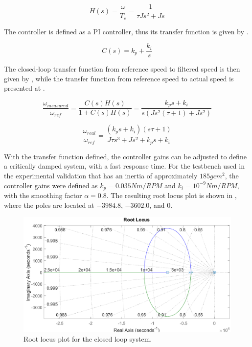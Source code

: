 \begin{equation}
		H(s) = \frac{\omega}{T_e} = \frac{1}{\tau J s^2+J s}
	\label{eq:plant_speed_controller}
\end{equation}

The controller is defined as a PI controller, thus its transfer function is given by .

\begin{equation}
		C(s) = k_p + \frac{k_i}{s}
	\label{eq:controller_speed}
\end{equation}

The closed-loop transfer function from reference speed to filtered speed is then given by , while the transfer function from reference speed to actual speed is presented at .

\begin{equation}
		\frac{\omega_{measured}}{\omega_{ref}} = \frac{C(s) H(s)}{1+C(s) H(s)} = 
		\frac{k_p s + k_i}{s (J s^2 (\tau + 1) + J s^2)}
	\label{eq:closed_loop_speed}
\end{equation}

\begin{equation}
		\frac{\omega_{real}}{\omega_{ref}} = \frac{(k_p s + k_i)(s\tau + 1)}{J\tau s^3 + J s^2 + k_p s + k_i}
		\label{eq:closed_loop_speed_actual}
\end{equation}

With the transfer function defined, the controller gains can be adjusted to define a critically damped system, with a fast response time. For the testbench used in the experimental validation that has an inertia of approximately $185 g cm^2$, the controller gains were defined as $k_p = 0.035Nm/RPM$ and $k_i = 10^{-9} Nm/RPM$, with the smoothing factor $\alpha = 0.8$. The resulting root locus plot is shown in , where the poles are located at $-3984.8$, $-3602.0$, and $0$.

\begin{figure}[!htb]
	\centering
	\includegraphics[width=1\textwidth]{Figures/rlocus_speed.eps}
	\caption[Root locus plot for the closed loop system.]{Root locus plot for the closed loop system.}
	\label{fig:root_locus_speed}%
\end{figure}